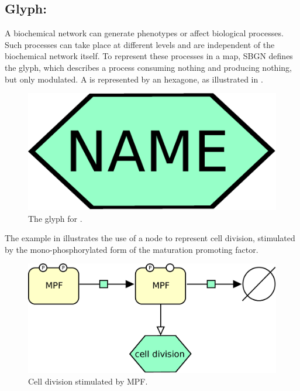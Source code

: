 \subsection{Glyph: }
\label{sec:phenotype}

A biochemical network can generate phenotypes or affect biological
processes.  Such processes can take place at different levels and are
independent of the biochemical network itself.  To represent these
processes in a map, SBGN defines the  glyph, which describes a process consuming nothing and producing nothing, but only modulated. A  is represented by an hexagone, as illustrated in . 

\begin{figure}[H]
  \centering
  \includegraphics[scale = 0.3]{images/phenotype}
  \caption{The \PD glyph for .}
  \label{fig:phenotype}
\end{figure}

The example in  illustrates the use of a  node to represent cell division, stimulated by the mono-phosphorylated form of the maturation promoting factor. 

\begin{figure}[H]
  \centering
  \includegraphics[scale = 0.4]{images/phenotype-MPF}
  \caption{Cell division stimulated by MPF.}
  \label{fig:phenotype-MPF}
\end{figure}
